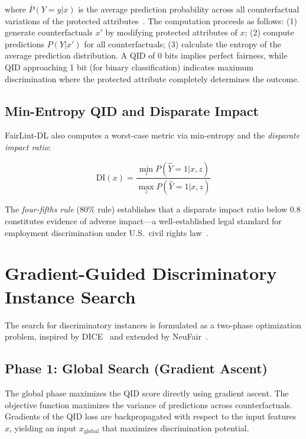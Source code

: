where $\bar{P}(Y=y | x)$ is the average prediction probability across all counterfactual variations of the protected attributes~\cite{dice}. The computation proceeds as follows: (1) generate counterfactuals $x'$ by modifying protected attributes of $x$; (2) compute predictions $P(Y | x')$ for all counterfactuals; (3) calculate the entropy of the average prediction distribution. A QID of 0 bits implies perfect fairness, while QID approaching 1 bit (for binary classification) indicates maximum discrimination where the protected attribute completely determines the outcome.

\subsection{Min-Entropy QID and Disparate Impact}

FairLint-DL also computes a worst-case metric via min-entropy and the \emph{disparate impact ratio}:

\begin{equation}
    \text{DI}(x) = \frac{\min_{z} P(\hat{Y}=1 | x, z)}{\max_{z} P(\hat{Y}=1 | x, z)}
    \label{eq:disparate_impact}
\end{equation}

The \emph{four-fifths rule} (80\% rule) establishes that a disparate impact ratio below 0.8 constitutes evidence of adverse impact---a well-established legal standard for employment discrimination under U.S.\ civil rights law~\cite{dice}.

\section{Gradient-Guided Discriminatory Instance Search}

The search for discriminatory instances is formulated as a two-phase optimization problem, inspired by DICE~\cite{dice} and extended by NeuFair~\cite{neufair}.

\subsection{Phase 1: Global Search (Gradient Ascent)}

The global phase maximizes the QID score directly using gradient ascent. The objective function maximizes the variance of predictions across counterfactuals. Gradients of the QID loss are backpropagated with respect to the input features $x$, yielding an input $x_{\text{global}}$ that maximizes discrimination potential.

